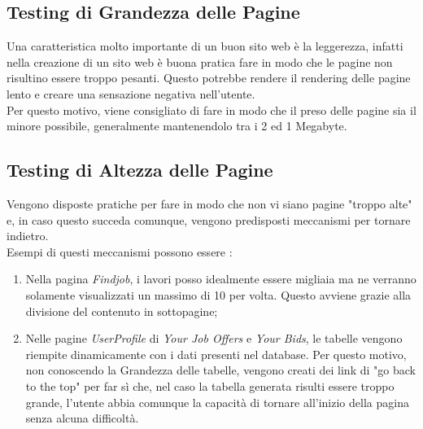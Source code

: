   \subsection{Testing di Grandezza delle Pagine}
    Una caratteristica molto importante di un buon sito web è la leggerezza, infatti nella creazione di un sito web è buona pratica fare in modo che le pagine non risultino essere troppo pesanti. Questo potrebbe rendere il rendering delle pagine lento e creare una sensazione negativa nell'utente.\\
    Per questo motivo, viene consigliato di fare in modo che il preso delle pagine sia il minore possibile, generalmente mantenendolo tra i 2 ed 1 Megabyte. 

  \subsection{Testing di Altezza delle Pagine}
    Vengono disposte pratiche per fare in modo che non vi siano pagine "troppo alte" e, in caso questo succeda comunque, vengono predisposti meccanismi per tornare indietro. \\
    Esempi di questi meccanismi possono essere :
    \begin{enumerate}
      \item Nella pagina \textit{Findjob}, i lavori posso idealmente essere migliaia ma ne verranno solamente visualizzati un massimo di 10 per volta. Questo avviene grazie alla divisione del contenuto in sottopagine;
      \item Nelle pagine \textit{UserProfile} di \textit{Your Job Offers} e \textit{Your Bids}, le tabelle vengono riempite dinamicamente con i dati presenti nel database. Per questo motivo, non conoscendo la Grandezza
      delle tabelle, vengono creati dei link di "go back to the top" per far sì che, nel caso la tabella generata risulti essere troppo grande, l'utente abbia comunque la capacità di tornare all'inizio della pagina senza alcuna difficoltà.
    \end{enumerate}